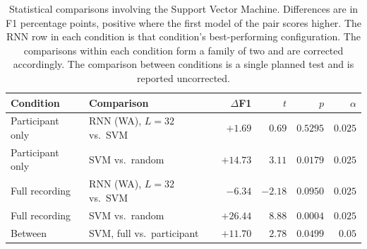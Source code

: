 \documentclass{mproj}
\begin{document}
\begin{table}[htbp]
  \centering
  \caption{Statistical comparisons involving the Support Vector Machine.
  Differences are in F1 percentage points, positive where the first model of
  the pair scores higher. The RNN row in each condition is that condition's best-performing configuration. The comparisons within each condition form a family
  of two and are corrected accordingly. The comparison between conditions is a
  single planned test and is reported uncorrected.}
  \label{tab:appendix-stats-svm}
  \begin{tabular}{llrrrr}
    \toprule
    Condition & Comparison & $\Delta$F1 & $t$ & $p$ & $\alpha$ \\
    \midrule
    Participant only & RNN (WA), $L = 32$ vs.\ SVM & $+1.69$  & $0.69$  & $0.5295$ & $0.025$ \\
    Participant only & SVM vs.\ random             & $+14.73$ & $3.11$  & $0.0179$ & $0.025$ \\
    Full recording   & RNN (WA), $L = 32$ vs.\ SVM & $-6.34$  & $-2.18$ & $0.0950$ & $0.025$ \\
    Full recording   & SVM vs.\ random             & $+26.44$ & $8.88$  & $0.0004$ & $0.025$ \\
    \midrule
    Between          & SVM, full vs.\ participant  & $+11.70$ & $2.78$  & $0.0499$ & $0.05$  \\
    \bottomrule
  \end{tabular}
\end{table}



\end{document}

